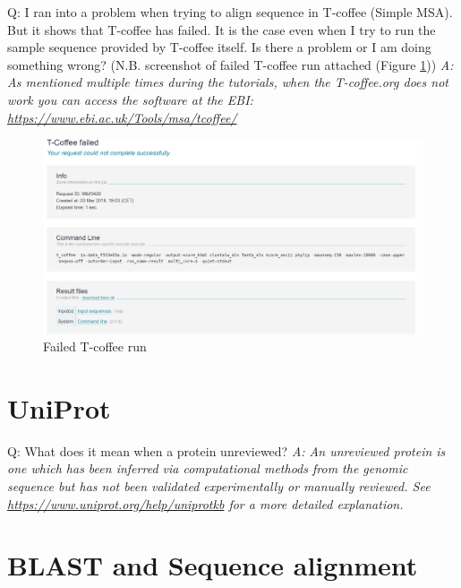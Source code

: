\documentclass[10pt,a4paper]{article}
\begin{document}
Q: I ran into a problem when trying to align sequence in T-coffee (Simple MSA). But it shows that T-coffee has failed. It is the case even when I try to run the sample sequence provided by T-coffee itself. Is there a problem or I am doing something wrong? (N.B. screenshot of failed T-coffee run attached (Figure \ref{figure:failedTcoffee})) \newline
\textit{A: As mentioned multiple times during the tutorials, when the T-coffee.org does not work you can access the software at the EBI: \url{https://www.ebi.ac.uk/Tools/msa/tcoffee/}} \newline
\begin{figure}[!ht]
\centering \includegraphics[width=\textwidth]{failed_tcoffee.png}
\caption{Failed T-coffee run}
\label{figure:failedTcoffee}
\end{figure}

\section{UniProt}
Q: What does it mean when a protein unreviewed? \newline
\textit{A: An unreviewed protein is one which has been inferred via computational methods from the genomic sequence but has not been validated experimentally or manually reviewed. See \url{https://www.uniprot.org/help/uniprotkb} for a more detailed explanation.} \newline

\section{BLAST and Sequence alignment}
\end{document}
